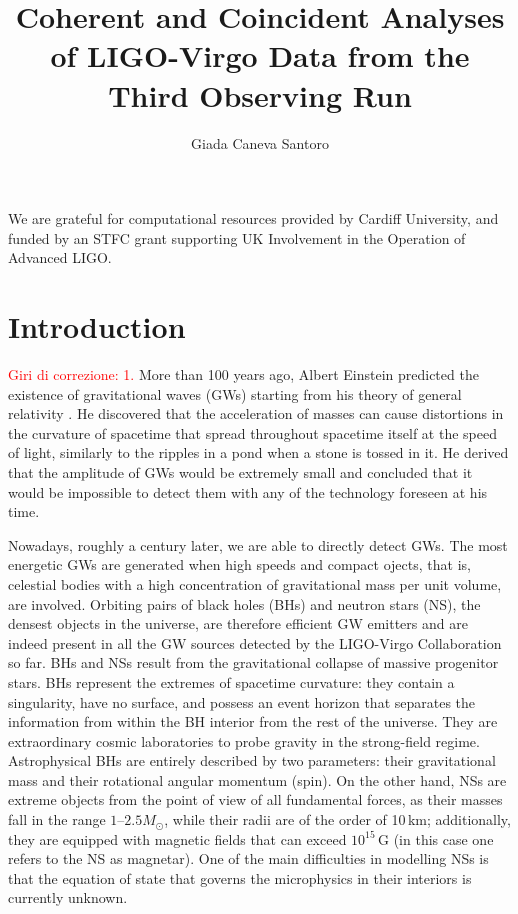 \documentclass[binding=0.6cm, LaM]{sapthesis}
\title{Coherent and Coincident Analyses of LIGO-Virgo Data from the Third Observing Run}
\author{Giada Caneva Santoro}
\newcommand{\fpg}[1]{\textcolor{red}{#1} }
\begin{document}
\frontmatter
\maketitle
\dedication{Fortsett å gå.}


\tableofcontents

\begin{acknowledgments}
We are grateful for computational resources provided by Cardiff University, and funded by an STFC grant supporting UK Involvement in the Operation of Advanced LIGO.
\end{acknowledgments}

\mainmatter 

\chapter*{Introduction}
%
\fpg{Giri di correzione: 1.}%
	More than 100 years ago, Albert Einstein predicted the existence of gravitational waves (GWs) starting from his theory of general relativity \cite{1,2}.
	He discovered that the acceleration of masses
	can cause distortions in the curvature of spacetime that 
        spread throughout spacetime itself at the speed of light, similarly to the ripples in a pond when a stone is tossed in it.
	He derived that the amplitude of GWs would be extremely small and concluded that it would be impossible to detect them with any of the technology foreseen at his time.

	Nowadays, roughly a century later, we are able to directly detect GWs.  
	The most energetic GWs are generated when high speeds and compact ojects, that is, 	
	celestial bodies with a high concentration of gravitational mass per unit volume, are involved.
	Orbiting pairs of black holes (BHs) and neutron stars (NS), the densest objects in the universe,
	are therefore efficient GW emitters and are indeed present in all the GW sources detected by the LIGO-Virgo Collaboration so far.
        BHs and NSs result from the gravitational collapse of massive progenitor stars.
        BHs represent the extremes of spacetime curvature:
        they contain a singularity, have no surface, and possess an event horizon that separates the information
        from within the BH interior from the rest of the universe.
        They are extraordinary cosmic laboratories to probe gravity in the strong-field regime.
        Astrophysical BHs are entirely described by two parameters: their gravitational mass and their rotational angular momentum (spin).
        On the other hand, NSs are extreme objects from the point of view of all fundamental forces, 
	as their masses fall in the range $1$--$2.5M_\odot$, while their radii are of the order of 10\,km; 
	additionally, they are equipped with magnetic fields that can exceed $10^{15}\,$G 
	(in this case one refers to the NS as magnetar). 
	One of the main difficulties in modelling NSs is that the equation of state that governs the microphysics in their interiors is currently unknown.
\end{document}
